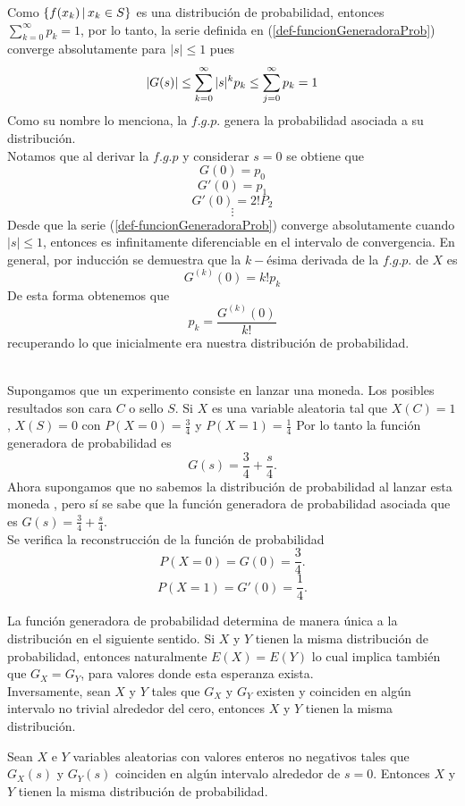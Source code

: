 Como $\{f(x_k)\thinspace|\thinspace x_k\in S\}$ es una distribución de probabilidad, entonces\\ $\sum_{k=0}^\infty p_k=1$, por lo tanto, la serie definida en (\ref{def-funcionGeneradoraProb}) converge absolutamente para $|s|\leq 1$ pues $$|G(s)|\leq \sum_{k=0}^\infty|s|^k p_k\leq\sum_{j=0}^{\infty} p_k=1 $$ 
Como su nombre lo menciona, la $f.g.p.$ genera la probabilidad asociada a su distribución.\\
Notamos que al derivar la $f.g.p$ y considerar $s=0$ se obtiene que
$$G(0)=p_0$$ $$G'(0)=p_1$$ $$G'(0)=2!P_2$$ $$\vdots$$Desde que la serie (\ref{def-funcionGeneradoraProb}) converge absolutamente cuando $|s|\leq 1$, entonces es infinitamente diferenciable en el intervalo de convergencia. En general, por inducción se demuestra que la $k-$ésima derivada de la $f.g.p.$ de $X$ es $$G^{(k)}(0)=k!p_k$$
De esta forma obtenemos que $$p_k=\frac{G^{(k)}(0)}{k!}$$ recuperando lo que inicialmente era nuestra distribución de probabilidad.\\\\
\begin{Ejm}
    Supongamos que un experimento consiste en lanzar una moneda. Los posibles resultados son cara $C$ o sello $S$. Si $X$ es una variable aleatoria tal que $X(C)=1$, $X(S)=0$ con $P(X=0)=\frac{3}{4}$ y $P(X=1)=\frac{1}{4}$
    Por lo tanto la función generadora de probabilidad es
    $$G(s)=\frac{3}{4}+\frac{s}{4}.$$
    Ahora supongamos que no sabemos la distribución de probabilidad al lanzar esta moneda , pero sí se sabe que la función generadora de probabilidad asociada que es $G(s)=\frac{3}{4}+\frac{s}{4}.$\\
    Se verifica la reconstrucción de la función de probabilidad
    $$P(X=0)=G(0)=\frac{3}{4}.$$    $$P(X=1)=G'(0)=\frac{1}{4}.$$
\end{Ejm}
La función generadora de probabilidad determina de manera única a la distribución en el siguiente sentido. Si $X$ y $Y$ tienen la misma distribución de probabilidad, entonces naturalmente $E(X)=E(Y)$ lo cual implica también que $G_X=G_Y$, para valores donde esta esperanza exista.\\
Inversamente, sean $X$ y $Y$ tales que $G_X$ y
$G_Y$ existen y coinciden en algún intervalo no trivial alrededor del cero,
entonces $X$ y $Y$ tienen la misma distribución.
\begin{Prop}
    Sean $X$ e $Y$ variables aleatorias con valores enteros no negativos tales que $G_X(s)$ y $G_Y(s)$ coinciden en algún intervalo alrededor de $s=0$. Entonces $X$ y $Y$ tienen la misma distribución de probabilidad. \label{prop-funcionGenIgual-distribucuionIgual}
\end{Prop}
